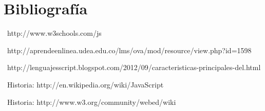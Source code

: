 \documentclass[11pt]{article} %
\begin{document}


\newpage

\section{Bibliografía}


\  {http://www.w3schools.com/js }

\  {http://aprendeenlinea.udea.edu.co/lms/ova/mod/resource/view.php?id=1598 }

\  {http://lenguajesscript.blogspot.com/2012/09/caracteristicas-principales-del.html }

\ {Historia: http://en.wikipedia.org/wiki/JavaScript} 

\ {Historia: http://www.w3.org/community/webed/wiki}
\end{document}
